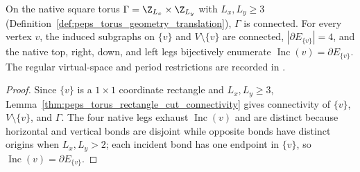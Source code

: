 \begin{lemma}%
    \label{lem:peps_torus_singleton_geometry}
    \leanok
    On the native square torus $\Gamma=\Z_{L_x}\times\Z_{L_y}$ with
    $L_x,L_y\ge 3$ (Definition~\ref{def:peps_torus_geometry_translation}),
    $\Gamma$ is connected. For every vertex $v$, the induced subgraphs on
    $\{v\}$ and $V\setminus\{v\}$ are connected, $|\partial E_{\{v\}}|=4$,
    and the native top, right, down, and left legs bijectively enumerate
    $\operatorname{Inc}(v)=\partial E_{\{v\}}$.
    The regular virtual-space and period restrictions are recorded in
    \cite{gap:rmp_peps_quantum_double_g_isometry}.
\end{lemma}

\begin{proof}\leanok
    Since $\{v\}$ is a $1\times 1$ coordinate rectangle and $L_x,L_y\ge 3$,
    Lemma~\ref{thm:peps_torus_rectangle_cut_connectivity} gives connectivity
    of $\{v\}$, $V\setminus\{v\}$, and $\Gamma$. The four native legs exhaust
    $\operatorname{Inc}(v)$ and are distinct because horizontal and vertical
    bonds are disjoint while opposite bonds have distinct origins when
    $L_x,L_y>2$; each incident bond has one endpoint in $\{v\}$, so
    $\operatorname{Inc}(v)=\partial E_{\{v\}}$.
\end{proof}

